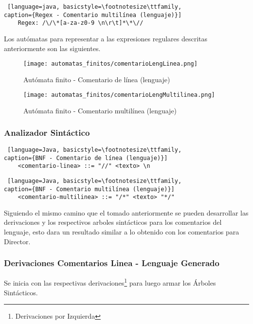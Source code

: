 \begin{lstlisting} [language=java, basicstyle=\footnotesize\ttfamily,
caption={Regex - Comentario multilínea (lenguaje)}]
	Regex: /\/\*[a-za-z0-9 \n\r\t]*\*\//
\end{lstlisting}

Los autómatas para representar a las expresiones regulares descritas
anteriormente son las siguientes.

\begin{figure}[H]
	\centering
	\texttt{[image: automatas\_finitos/comentarioLengLinea.png]}
	\caption{Autómata finito - Comentario de línea (lenguaje)}
	\label{fig:af_com_linea_leng}
\end{figure}

\begin{figure}[H]
	\centering
	\texttt{[image: automatas\_finitos/comentarioLengMultilinea.png]}
	\caption{Autómata finito - Comentario multilínea (lenguaje)}
	\label{fig:af_com_multi_leng}
\end{figure}

\subsubsection{Analizador Sintáctico}

\begin{lstlisting} [language=Java, basicstyle=\footnotesize\ttfamily,
caption={BNF - Comentario de línea (lenguaje)}]
	<comentario-linea> ::= "//" <texto> \n
\end{lstlisting}

\begin{lstlisting} [language=Java, basicstyle=\footnotesize\ttfamily,
caption={BNF - Comentario multilínea (lenguaje)}]
	<comentario-multilinea> ::= "/*" <texto> "*/"
\end{lstlisting}

Siguiendo el mismo camino que el tomado anteriormente se pueden desarrollar las
derivaciones y los respectivos arboles sintácticos para los comentarios del
lenguaje, esto dara un resultado similar a lo obtenido con los comentarios para
Director.

\subsubsection{Derivaciones Comentarios Linea - Lenguaje Generado}

Se inicia con las respectivas derivaciones\footnote{Derivaciones por Izquierda}
para luego armar los Árboles Sintácticos.

